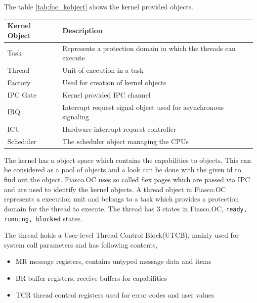 The table \ref{tab:foc_kobject} shows the kernel provided objects.
\begin{center}
\begin{tabular}{|l|p{10cm}|}
\hline 
\textbf{ Kernel Object} & \textbf{Description} \\ \hline

Task & Represents a protection domain in which the threads can execute\\ \hline

Thread & Unit of execution in a task
\\ \hline

Factory & Used for creation of kernel objects \\ \hline

IPC Gate &  Kernel provided IPC channel\\ \hline

IRQ & Interrupt request signal object used for asynchronous signaling\\ \hline

ICU & Hardware interrupt request controller \\ \hline

Scheduler &  The scheduler object managing the CPUs \\ \hline
\end{tabular}
\label{tab:foc_kobject}
\end{center}

The kernel has a object space which contains the capabilities to objects. This can be considered as a pool of objects and a look can be done with the given id to find out the object. Fiasco.OC uses so called flex pages which are passed via IPC and are used to identify the kernel objects. A thread object in Fiasco.OC represents a execution unit and belongs to a task which provides a protection domain for the thread to execute. The thread has 3 states in Fiasco.OC, \texttt{ready, running, blocked} states. 

The thread holds a User-level Thread Control Block(UTCB), mainly used for system call parameters and has following contents,
\begin{itemize}
\item MR message registers, contains untyped message data and items

\item BR buffer registers, receive buffers for capabilities

\item TCR thread control registers used for error codes and user values
\end{itemize}

